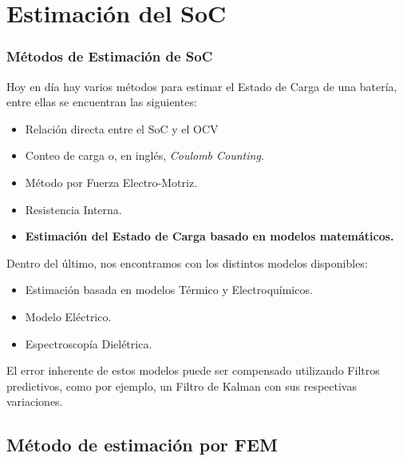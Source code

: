 \documentclass[10pt]{beamer}
\theoremstyle{remark}
\theoremstyle{definition}
\begin{document}
\section{Estimación del SoC}

\begin{frame}[allowframebreaks]
  \frametitle{Métodos de Estimación de SoC}

  Hoy en día hay varios métodos para estimar el Estado de Carga de una batería,
  entre ellas se encuentran las siguientes:
  \begin{itemize}
	\item Relación directa entre el SoC y el OCV
	\item Conteo de carga o, en inglés, \emph{Coulomb Counting}.
	\item Método por Fuerza Electro-Motriz.
	\item Resistencia Interna.
	\item \textbf{Estimación del Estado de Carga basado en modelos matemáticos.}
  \end{itemize}

  \framebreak

  Dentro del último, nos encontramos con los distintos modelos disponibles:

  \begin{itemize}
	\item Estimación basada en modelos Térmico y Electroquímicos.
	\item Modelo Eléctrico.
	\item Espectroscopía Dielétrica.
  \end{itemize}

  El error inherente de estos modelos puede ser compensado utilizando Filtros
  predictivos, como por ejemplo, un Filtro de Kalman con sus respectivas
  variaciones.

\end{frame}

\subsection{Método de estimación por FEM}
\end{document}

